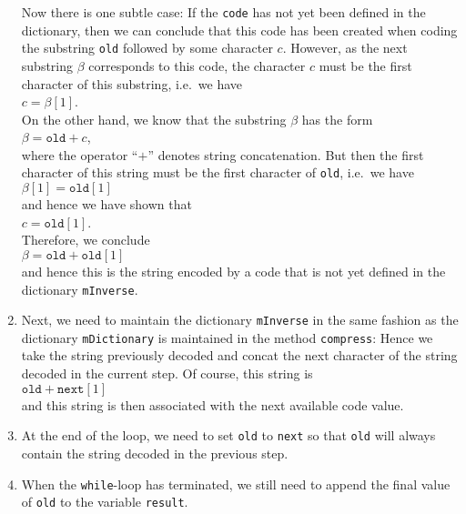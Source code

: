 \begin{enumerate}
      Now there is one subtle case: If the \texttt{code} has not yet been defined in the
      dictionary,  then we can conclude that this code has been created when coding the
      substring \texttt{old} followed by some character $c$.  However, as the next substring $\beta$
      corresponds to this code, the character $c$ must be the first
      character of this substring, i.e.~we have
      \\[0.2cm]
      \hspace*{1.3cm}
      $c = \beta[1]$.
      \\[0.2cm]
      On the other hand, we know that the substring $\beta$ has the form
      \\[0.2cm]
      \hspace*{1.3cm}
      $\beta = \mathtt{old} + c$,
      \\[0.2cm]
      where the operator ``$+$'' denotes string concatenation.  But then the first character of this string
      must be the first character of \texttt{old}, i.e.~we have
      \\[0.2cm]
      \hspace*{1.3cm}
      $\beta[1] = \mathtt{old}[1]$
      \\[0.2cm]
      and hence we have shown that
      \\[0.2cm]
      \hspace*{1.3cm}
      $c = \mathtt{old}[1]$.
      \\[0.2cm]
      Therefore, we conclude
      \\[0.2cm]
      \hspace*{1.3cm}
      $\beta = \mathtt{old} + \mathtt{old}[1]$
      \\[0.2cm]
      and hence this is the string encoded by a code that is not yet defined in the dictionary
      \texttt{mInverse}.
\item Next, we need to maintain the dictionary \texttt{mInverse} in the same fashion as the
      dictionary \texttt{mDictionary} is maintained in the method \texttt{compress}:
      Hence we take the string previously decoded and concat the next character of the
      string decoded in the current step.  Of course, this string is
      \\[0.2cm]
      \hspace*{1.3cm}
      $\texttt{old} + \mathtt{next}[1]$
      \\[0.2cm]
      and this string is then associated with the next available code value.
\item At the end of the loop, we need to set \texttt{old} to \texttt{next} so that \texttt{old}
      will always contain the string decoded in the previous step.
\item When the \texttt{while}-loop has terminated, we still need to append the final value of \texttt{old}
      to the variable \texttt{result}.
\end{enumerate}
